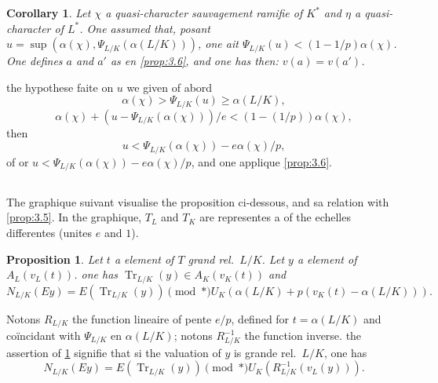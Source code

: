 \documentclass[12pt,a4paper]{article}
\theoremstyle{plain}
\newtheorem{proposition}[theorem]{Proposition}
\newtheorem{corollary}[theorem]{Corollary}
\theoremstyle{definition}
\theoremstyle{remark}
\DeclareMathOperator{\Tr}{Tr}
\providecommand{\Tr}{\operatorname{Tr}}
\begin{document}
\begin{corollary}\label{cor:3.7}
Let $\chi$ a quasi-character sauvagement ramifie of $K^*$ and $\eta$ a quasi-character of $L^*$. One assumed that, posant $u = \sup(\alpha(\chi), \Psi_{L/K}(\alpha(L/K)))$, one ait $\Psi_{L/K}(u) < (1-1/p) \alpha(\chi)$. One defines $a$ and $a'$ as en \ref{prop:3.6}, and one has then: $v(a) = v(a')$.
\end{corollary}

the hypothese faite on $u$ we given of abord
\[
\alpha(\chi) > \Psi_{L/K}(u) \geq \alpha(L/K),
\]
\[
\alpha(\chi) + (u - \Psi_{L/K}(\alpha(\chi)))/e < (1 - (1/p)) \alpha(\chi),
\]
then
\[
u < \Psi_{L/K}(\alpha(\chi)) - e\alpha(\chi)/p,
\]
of or $u < \Psi_{L/K}(\alpha(\chi)) - e\alpha(\chi)/p$, and one applique \ref{prop:3.6}.

\subsection{}
\label{sec:3.8}

The graphique suivant visualise the proposition ci-dessous, and sa relation with \ref{prop:3.5}. In the graphique, $T_L$ and $T_K$ are representes a of the echelles differentes (unites $e$ and $1$).

\begin{proposition}\label{prop:3.8}
Let $t$ a element of $T$ grand rel.~$L/K$. Let $y$ a element of $A_L(v_L(t))$. one has $\Tr_{L/K}(y) \in A_K(v_K(t))$ and
\[
N_{L/K}(Ey) = E(\Tr_{L/K}(y)) \pmod{*} U_K(\alpha(L/K) + p(v_K(t) - \alpha(L/K))).
\]
\end{proposition}

Notons $R_{L/K}$ the function lineaire of pente $e/p$, defined for $t = \alpha(L/K)$ and co\"incidant with $\Psi_{L/K}$ en $\alpha(L/K)$; notons $R_{L/K}^{-1}$ the function inverse. the assertion of \ref{prop:3.8} signifie that si the valuation of $y$ is grande rel.~$L/K$, one has
\[
N_{L/K}(Ey) = E(\Tr_{L/K}(y)) \pmod{*} U_K(R_{L/K}^{-1}(v_L(y))).
\]
\end{document}
